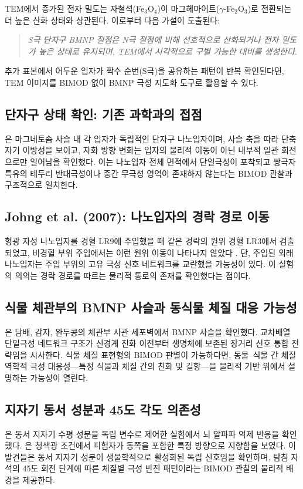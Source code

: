 \documentclass[12pt,a4paper]{article}
\begin{document}
TEM에서 증가된 전자 밀도는 자철석(Fe$_3$O$_4$)이
마그헤마이트($\gamma$-Fe$_2$O$_3$)로 전환되는 더 높은 산화 상태와 상관된다.
이로부터 다음 가설이 도출된다:

\begin{quote}
\textit{S극 단자구 BMNP 절점은 N극 절점에 비해 선호적으로 산화되거나
전자 밀도가 높은 상태로 유지되며, TEM에서 시각적으로 구별 가능한
대비를 생성한다.}
\end{quote}

추가 표본에서 어두운 입자가 짝수 순번(S극)을 공유하는 패턴이 반복 확인된다면,
TEM 이미지를 BIMOD 없이 BMNP 극성 지도화 도구로 활용할 수 있다.

\subsection{단자구 상태 확인: 기존 과학과의 접점}
\cite{kornig2020}은 마그네토솜 사슬 내 각 입자가 독립적인 단자구 나노입자이며,
사슬 축을 따라 단축 자기 이방성을 보이고,
자화 방향 변화는 입자의 물리적 이동이 아닌 내부적 일관 회전으로만
일어남을 확인했다.
이는 나노입자 전체 면적에서 단일극성이 포착되고
쌍극자 특유의 테두리 반대극성이나 중간 무극성 영역이 존재하지 않는다는
BIMOD 관찰과 구조적으로 일치한다.

\subsection{Johng et al. (2007): 나노입자의 경락 경로 이동}
형광 자성 나노입자를 경혈 LR9에 주입했을 때 같은 경락의 원위 경혈 LR3에서
검출되었고, 비경혈 부위 주입에서는 이런 원위 이동이 나타나지 않았다
\cite{johng2007}.
단, 주입된 외래 나노입자는 주입 부위의 고유 극성 신호 네트워크를
교란했을 가능성이 있다.
이 실험의 의의는 경락 경로를 따르는 물리적 통로의 존재를 확인했다는 점이다.

\subsection{식물 체관부의 BMNP 사슬과 동식물 체질 대응 가능성}
\cite{gorobets2023}은 담배, 감자, 완두콩의 체관부 사관 세포벽에서
BMNP 사슬을 확인했다.
교차배열 단일극성 네트워크 구조가 신경계 진화 이전부터
생명체에 보존된 장거리 신호 통합 전략임을 시사한다.
식물 체질 표현형의 BIMOD 판별이 가능하다면,
동물--식물 간 체질역학적 극성 대응성---특정 식물과 체질 간의 친화 및 길항---을
물리적 기반 위에서 설명하는 가능성이 열린다.

\subsection{지자기 동서 성분과 45도 각도 의존성}
\cite{wang2019}은 동서 지자기 수평 성분을 독립 변수로 제어한 실험에서
뇌 알파파 억제 반응을 확인했다.
\cite{chae2019}은 청색광 조건에서 피험자가 동쪽을 포함한 특정 방향으로
지향함을 보였다.
이 발견들은 동서 지자기 성분이 생물학적으로 활성화된 독립 신호임을 확인하며,
탐침 자석의 45도 회전 단계에 따른 체질별 극성 반전 패턴이라는
BIMOD 관찰의 물리적 배경을 제공한다.
\end{document}
